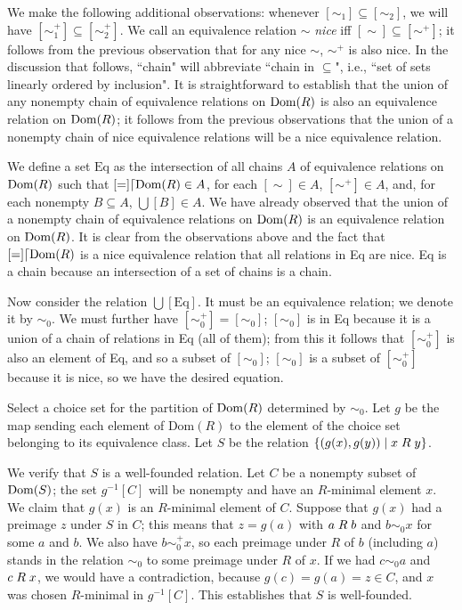 We make the following additional observations: whenever $[\sim_1]
\subseteq [\sim_2]$, we will have $[\sim_1^+]
\subseteq [\sim_2^+]$. We call an equivalence relation $\sim$ {\itshape
nice\/} iff $[\sim] \subseteq [\sim^+]$; it follows from the previous
observation that for any nice $\sim$, $\sim^+$ is also nice.  In the discussion that follows, ``chain" will abbreviate ``chain in $\subseteq$", i.e., ``set of sets linearly ordered by inclusion".  It is
straightforward to establish that the union of any nonempty
chain of equivalence relations on $\mathop{\mathrm{Dom}}(R)$ is also an
equivalence relation on $\mathop{\mathrm{Dom}}(R)$; it follows from the previous
observations that the union of a nonempty chain of nice equivalence
relations will be a nice equivalence relation.

We define a set $\mathrm{Eq}$ as the intersection of all chains $A$ of
equivalence relations on $\mathop{\mathrm{Dom}}(R)$ such that $[=]\lceil \mathop{\mathrm{Dom}}(R) \in A$, for
each $[\sim] \in A$, $[\sim^+] \in A$, and, for each nonempty $B
\subseteq A$, $\bigcup[B] \in A$.  We have already observed that the
union of a nonempty chain of equivalence relations on $\mathop{\mathrm{Dom}}(R)$ is an
equivalence relation on $\mathop{\mathrm{Dom}}(R)$.  It is clear from the observations
above and the fact that $[=]\lceil \mathop{\mathrm{Dom}}(R)$ is a nice equivalence
relation that all relations in Eq are nice.  Eq is a chain because an intersection of a set of chains is a chain.

Now consider the relation $\bigcup[\mathrm{Eq}]$.  It must be an equivalence
relation; we denote it by $\sim_0$.  We must further have $[\sim_0^+]
= [\sim_0]$; $[\sim_0]$ is in Eq because it is a union of a chain of relations in
Eq (all of them); from this it follows that $[\sim_0^+]$ is also an
element of Eq, and so a subset of $[\sim_0]$; $[\sim_0]$ is a subset
of $[\sim_0^+]$ because it is nice, so we have the desired equation.

Select a choice set for the partition of $\mathop{\mathrm{Dom}}(R)$ determined by
$\sim_0$.  Let $g$ be the map sending each element of Dom$(R)$ to the
element of the choice set belonging to its equivalence class.  Let $S$
be the relation $\{(g(x),g(y))\mid x \mathrel{R} y\}$.  

We verify that $S$ is a well-founded relation.  Let $C$ be a nonempty
subset of $\mathop{\mathrm{Dom}}(S)$; the set $g^{-1}[C]$ will be nonempty and have an
$R$-minimal element $x$.  We claim that $g(x)$ is an $R$-minimal
element of $C$.  Suppose that $g(x)$ had a preimage $z$ under $S$ in
$C$; this means that $z=g(a)$ with $a\mathrel{R} b$ and $b \sim_0 x$ for some
$a$ and $b$.  We also have $b \sim_0^+ x$, so each preimage under $R$
of $b$ (including $a$) stands in the relation $\sim_0$ to some
preimage under $R$ of $x$.  If we had $c \sim_0 a$ and $c \mathrel{R} x$,
we would have a contradiction, because $g(c) = g(a) = z \in C$, and
$x$ was chosen $R$-minimal in $g^{-1}[C]$.  This establishes that $S$
is well-founded.

